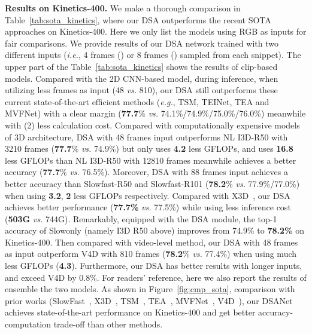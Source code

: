 \documentclass[sigconf]{acmart}
\def\x{}
\begin{document}
{{\textbf{Results on Kinetics-400.}
We make a thorough comparison in Table~\ref{tab:sota_kinetics}, where our DSA outperforms the recent SOTA approaches on Kinetics-400. Here we only list the models using RGB as inputs for fair comparisons. We provide results of our DSA network trained with two different inputs (\emph{i.e.}, 4 frames () or 8 frames () sampled from each snippet).
The upper part of the Table~\ref{tab:sota_kinetics} shows the results of clip-based models. Compared with the 2D CNN-based model, during inference, when utilizing less frames as input (4\x8 \emph{vs.} 8\x10), our DSA still outperforms these current state-of-the-art efficient methods (\emph{e.g.}, TSM, TEINet, TEA and MVFNet) with a clear margin (\textbf{77.7}\% \emph{vs.} 74.1\%/74.9\%/75.0\%/76.0\%) meanwhile with (2\x) less calculation cost. 
Compared with computationally expensive models of 3D architecture, DSA with 48 frames input outperforms NL I3D-R50 with 3210 frames (\textbf{77.7}\% \emph{vs.} 74.9\%) but only uses \textbf{4.2\x} less GFLOPs, and uses \textbf{16.8\x} less GFLOPs than NL I3D-R50 with 12810 frames meanwhile achieves a better accuracy (\textbf{77.7}\% \emph{vs.} 76.5\%). 
Moreover, DSA with 88 frames input achieves a better accuracy than Slowfast-R50 and Slowfast-R101 (\textbf{78.2}\% \emph{vs.} 77.9\%/77.0\%) when using \textbf{3.2\x}, \textbf{2\x} less GFLOPs respectively.
Compared with X3D~\cite{feichtenhofer2020x3d}, our DSA achieves better performance (\textbf{77.7\%} \emph{vs.} 77.5\%) while using less inference cost (\textbf{503G} \emph{vs.} 744G).
Remarkably, equipped with the DSA module, the top-1 accuracy of Slowonly (namely I3D R50 above) improves from 74.9\% to \textbf{78.2\%} on Kinetics-400.
Then compared with video-level method, our DSA with 4\x8 frames as input outperform V4D with 8\x10 frames (\textbf{78.2}\% \emph{vs.} 77.4\%) when using much less GFLOPs (\textbf{4.3\x}). 
Furthermore, our DSA has better results with longer inputs, and exceed V4D by 0.8\%. 
For readers’ reference, here we also report the results of ensemble the two models.
As shown in Figure~\ref{fig:cmp_sota}, comparison with prior works (SlowFast~\cite{slowfast}, X3D~\cite{feichtenhofer2020x3d}, TSM~\cite{tsm}, TEA~\cite{li2020tea}, MVFNet~\cite{wu2020MVFNet}, V4D~\cite{zhang2020v4d}), our DSANet achieves state-of-the-art performance on Kinetics-400 and get better accuracy-computation trade-off than other methods.







}}
\end{document}
